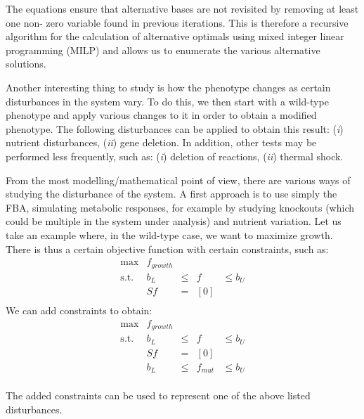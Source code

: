 The equations ensure that alternative bases are not revisited by removing at least one non-
zero variable found in previous iterations. This is therefore a recursive algorithm for the 
calculation of alternative optimals using mixed integer linear programming (MILP) and allows 
us to enumerate the various alternative solutions.

Another interesting thing to study is how the phenotype changes as certain disturbances in the
system vary. To do this, we then start with a wild-type phenotype and apply various changes to 
it in order to obtain a modified phenotype. The following disturbances can be applied to 
obtain this result: (\textit{i}) nutrient disturbances, (\textit{ii}) gene deletion.
In addition, other tests may be performed less frequently, such as: (\textit{i}) deletion of
reactions, (\textit{ii}) thermal shock.

From the most modelling/mathematical point of view, there are various ways of studying the 
disturbance of the system. A first approach is to use simply the FBA, simulating metabolic 
responses, for example by studying knockouts (which could be multiple in the system under 
analysis) and nutrient variation. Let us take an example where, in the wild-type case, we want 
to maximize growth. There is thus a certain objective function with certain constraints, such 
as:
\begin{equation}
  \begin{array}{rrclcl}
    \displaystyle \max & f_{growth} \\
    \textrm{s.t.} & b_L & \leq & f & \leq b_{U} \\
                       & Sf & = & [0] \\
  \end{array}
\end{equation}
We can add constraints to obtain:
\begin{equation}
  \begin{array}{rrclcl}
    \displaystyle \max & f_{growth} \\
    \textrm{s.t.} & b_L & \leq & f & \leq b_{U} \\
                    & Sf & = & [0] \\
                    & b_L & \leq & f_{mut} & \leq b_{U} \\
  \end{array}
\end{equation}

The added constraints can be used to represent one of the above listed disturbances.

